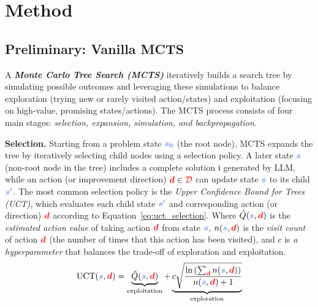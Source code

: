 \documentclass{article} %
\theoremstyle{definition}
\theoremstyle{remark}
\begin{document}
\section{Method}
\subsection{Preliminary: Vanilla MCTS}


A \textbf{\textit{Monte Carlo Tree Search (MCTS)}} iteratively builds a search tree by simulating possible outcomes and leveraging these simulations to balance exploration (trying new or rarely visited action/states) and exploitation (focusing on high-value, promising states/actions). The MCTS process consists of four main stages: 
\textit{selection, expansion, simulation, and backpropagation}.


\textbf{Selection.} Starting from a problem state $\textcolor{lightblue}{\boldsymbol{s_0}}$ (the root node), MCTS expands the tree by iteratively selecting child nodes using a selection policy. A later state $\textcolor{lightblue}{\boldsymbol{s}}$ (non-root node in the tree) includes a complete solution $\mathfrak{i}$ generated by LLM, while an action (or improvement direction) $\textcolor{red}{\boldsymbol{d}}\in\textcolor{red}{\mathcal D}$ can update state $\textcolor{lightblue}{\boldsymbol{s}}$ to its child $\textcolor{lightblue}{\boldsymbol{s'}}$. The most common selection policy is the \textit{Upper Confidence Bound for Trees (UCT)}, which evaluates
each child state $\textcolor{lightblue}{\boldsymbol{s'}}$ and corresponding action (or direction) $\textcolor{red}{\boldsymbol{d}}$ according to Equation~\ref{eq:uct_selection}. Where $\hat Q(\textcolor{lightblue}{\boldsymbol{s}}, \textcolor{red}{\boldsymbol{d}})$ is the \emph{estimated action value} of taking action $\textcolor{red}{\boldsymbol{d}}$ from state $\textcolor{lightblue}{\boldsymbol{s}}$, $n(\textcolor{lightblue}{\boldsymbol{s}}, \textcolor{red}{\boldsymbol{d}})$ is the \emph{visit count} of action $\textcolor{red}{\boldsymbol{d}}$ (the number of times that this action has been visited), and $c$ is \emph{a hyperparameter} that balances the trade-off of exploration and exploitation.
\begin{equation}
\label{eq:uct_selection}
\text{UCT}(\textcolor{lightblue}{\boldsymbol{s}},\textcolor{red}{\boldsymbol{d}}) = 
\underbrace{\hat Q(\textcolor{lightblue}{\boldsymbol{s}},\textcolor{red}{\boldsymbol{d}})}_{\text{exploitation}} +
  \underbrace{c \sqrt{\frac{\ln\left(\sum_{\textcolor{red}{\boldsymbol{\textcolor{red}{\boldsymbol{d}}}}} n(\textcolor{lightblue}{\boldsymbol{s}},\textcolor{red}{\boldsymbol{d}})\right)}{n(\textcolor{lightblue}{\boldsymbol{s}},{\textcolor{red}{\boldsymbol{d}}}) + 1}}}_{\text{exploration}}
\end{equation}
\end{document}
